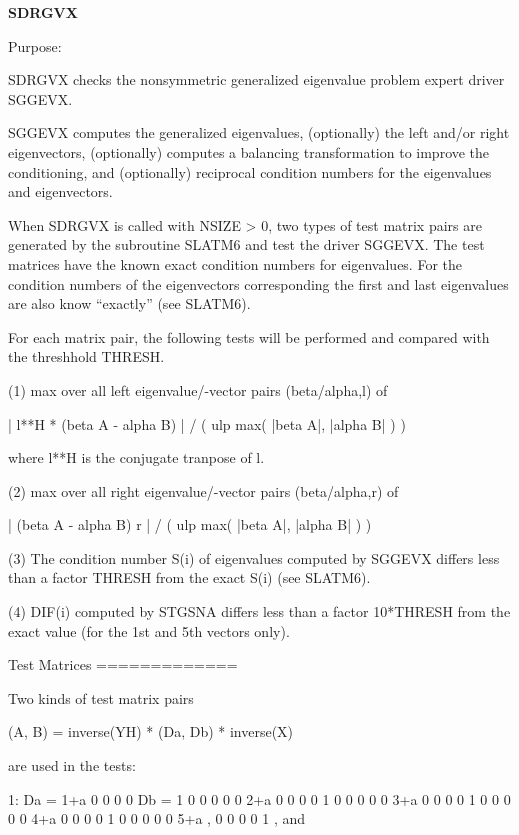 {\bfseries S\+D\+R\+G\+V\+X} 

\begin{DoxyParagraph}{Purpose\+: }
\begin{DoxyVerb} SDRGVX checks the nonsymmetric generalized eigenvalue problem
 expert driver SGGEVX.

 SGGEVX computes the generalized eigenvalues, (optionally) the left
 and/or right eigenvectors, (optionally) computes a balancing
 transformation to improve the conditioning, and (optionally)
 reciprocal condition numbers for the eigenvalues and eigenvectors.

 When SDRGVX is called with NSIZE > 0, two types of test matrix pairs
 are generated by the subroutine SLATM6 and test the driver SGGEVX.
 The test matrices have the known exact condition numbers for
 eigenvalues. For the condition numbers of the eigenvectors
 corresponding the first and last eigenvalues are also know
 ``exactly'' (see SLATM6).

 For each matrix pair, the following tests will be performed and
 compared with the threshhold THRESH.

 (1) max over all left eigenvalue/-vector pairs (beta/alpha,l) of

    | l**H * (beta A - alpha B) | / ( ulp max( |beta A|, |alpha B| ) )

     where l**H is the conjugate tranpose of l.

 (2) max over all right eigenvalue/-vector pairs (beta/alpha,r) of

       | (beta A - alpha B) r | / ( ulp max( |beta A|, |alpha B| ) )

 (3) The condition number S(i) of eigenvalues computed by SGGEVX
     differs less than a factor THRESH from the exact S(i) (see
     SLATM6).

 (4) DIF(i) computed by STGSNA differs less than a factor 10*THRESH
     from the exact value (for the 1st and 5th vectors only).

 Test Matrices
 =============

 Two kinds of test matrix pairs

          (A, B) = inverse(YH) * (Da, Db) * inverse(X)

 are used in the tests:

 1: Da = 1+a   0    0    0    0    Db = 1   0   0   0   0
          0   2+a   0    0    0         0   1   0   0   0
          0    0   3+a   0    0         0   0   1   0   0
          0    0    0   4+a   0         0   0   0   1   0
          0    0    0    0   5+a ,      0   0   0   0   1 , and


\end{DoxyVerb}
\end{DoxyParagraph}
